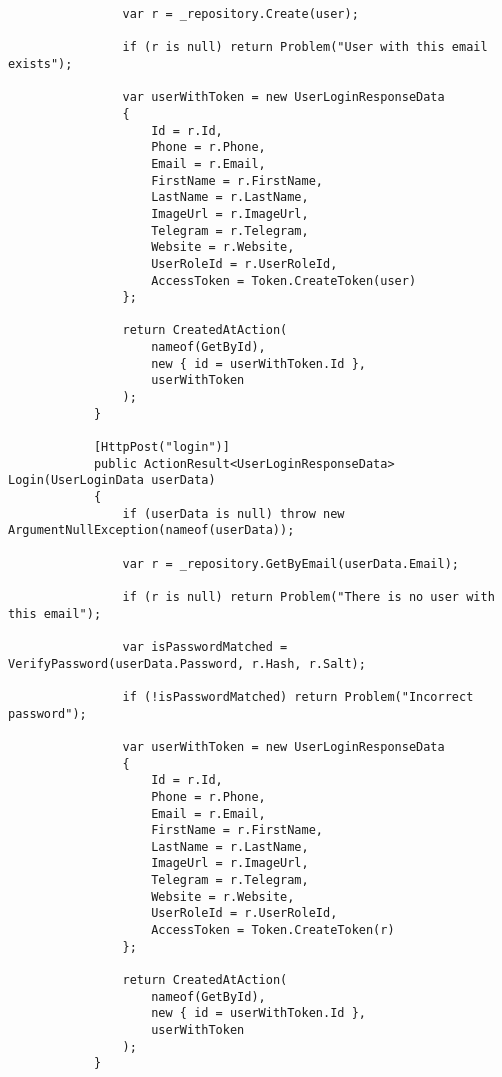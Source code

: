 \begin{lstlisting}
                var r = _repository.Create(user);
    
                if (r is null) return Problem("User with this email exists");
    
                var userWithToken = new UserLoginResponseData
                {
                    Id = r.Id,
                    Phone = r.Phone,
                    Email = r.Email,
                    FirstName = r.FirstName,
                    LastName = r.LastName,
                    ImageUrl = r.ImageUrl,
                    Telegram = r.Telegram,
                    Website = r.Website,
                    UserRoleId = r.UserRoleId,
                    AccessToken = Token.CreateToken(user)
                };
                
                return CreatedAtAction(
                    nameof(GetById),
                    new { id = userWithToken.Id },
                    userWithToken
                );
            }
            
            [HttpPost("login")]
            public ActionResult<UserLoginResponseData> Login(UserLoginData userData)
            {
                if (userData is null) throw new ArgumentNullException(nameof(userData));
            
                var r = _repository.GetByEmail(userData.Email);
                
                if (r is null) return Problem("There is no user with this email");
    
                var isPasswordMatched = VerifyPassword(userData.Password, r.Hash, r.Salt);
                
                if (!isPasswordMatched) return Problem("Incorrect password");
            
                var userWithToken = new UserLoginResponseData
                {
                    Id = r.Id,
                    Phone = r.Phone,
                    Email = r.Email,
                    FirstName = r.FirstName,
                    LastName = r.LastName,
                    ImageUrl = r.ImageUrl,
                    Telegram = r.Telegram,
                    Website = r.Website,
                    UserRoleId = r.UserRoleId,
                    AccessToken = Token.CreateToken(r)
                };
                
                return CreatedAtAction(
                    nameof(GetById),
                    new { id = userWithToken.Id },
                    userWithToken
                );
            }
            

\end{lstlisting}
